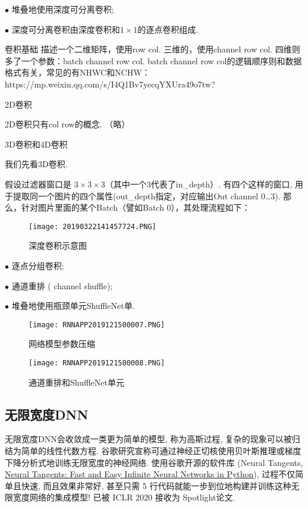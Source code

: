 \begin{tcolorbox}[title=MobileNet]
$\bullet$ 堆叠地使用深度可分离卷积;

$\bullet$ 深度可分离卷积由深度卷积和$1\times 1$的逐点卷积组成.
\end{tcolorbox}
\begin{remark}
卷积基础
描述一个二维矩阵，使用row col. 三维的，使用channel row col. 四维则多了一个参数：batch channel row col. batch channel row col的逻辑顺序则和数据格式有关，常见的有NHWC和NCHW：https://mp.weixin.qq.com/s/I4Q1Bv7yecqYXUra49o7tw?

2D卷积

2D卷积只有col row的概念. （略）

3D卷积和4D卷积



我们先看3D卷积.

假设过滤器窗口是 $3\times 3\times 3$（其中一个3代表了in\_depth）. 有四个这样的窗口,
用于提取同一个图片的四个属性(out\_depth指定，对应输出Out channel 0…3). 那么，针对图片里面的某个Batch（譬如Batch 0），其处理流程如下：
\begin{figure}[H]
\centering
\texttt{[image: 20190322141457724.PNG]}
\caption{深度卷积示意图}
\label{20190322141457724}
\vspace{-0.4cm}
\end{figure}
\end{remark}

\begin{tcolorbox}[title=ShuffleNet]
$\bullet$ 逐点分组卷积;

$\bullet$ 通道重排 ( channel shuffle);

$\bullet$ 堆叠地使用瓶颈单元ShuffleNet单.
\end{tcolorbox}
\begin{figure}[H]
    \centering
    \texttt{[image: RNNAPP2019121500007.PNG]}
    \caption{网络模型参数压缩}
    \label{RNNAPP2019121500007}\vspace{-0.4cm}
\end{figure}
\begin{figure}[H]
    \centering
    \texttt{[image: RNNAPP2019121500008.PNG]}
    \caption{通道重排和ShuffleNet单元}
    \label{RNNAPP2019121500008}\vspace{-0.4cm}
\end{figure}
\subsection{无限宽度DNN}
无限宽度DNN会收敛成一类更为简单的模型, 称为高斯过程, 复杂的现象可以被归结为简单的线性代数方程.
谷歌研究宣称可通过神经正切核使用贝叶斯推理或梯度下降分析式地训练无限宽度的神经网络.
使用谷歌开源的软件库 (Neural Tangents, \href{www.github.com/google/neural-tangents}{Neural Tangents: Fast and Easy Infinite Neural Networks in Python}),
过程不仅简单且快速, 而且效果非常好, 甚至只需 5 行代码就能一步到位地构建并训练这种无限宽度网络的集成模型!
已被 ICLR 2020 接收为 Spotlight论文.

